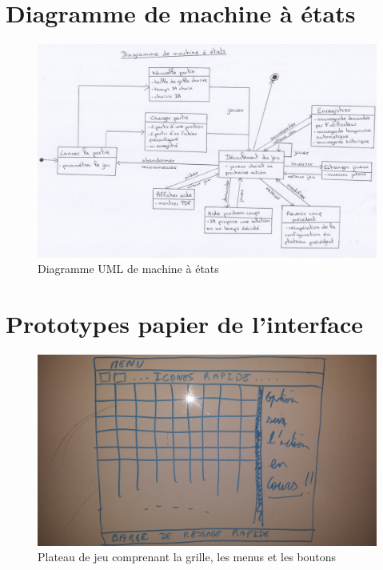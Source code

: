 \documentclass[a4paper,12pt]{article}
\begin{document}
\section{Diagramme de machine à états}
\label{C}
\begin{figure}[H]
  \includegraphics[scale=0.6]{machine-etat.jpeg}
\caption{Diagramme UML de machine à états}
\label{etat}
\end{figure}


\section{Prototypes papier de l'interface}
\label{D}

\begin{figure}[H]
\includegraphics[scale=0.1]{plateau.jpg}
\caption{Plateau de jeu comprenant la grille, les menus et les
  boutons}
\label{plateau}
\end{figure}
\end{document}

